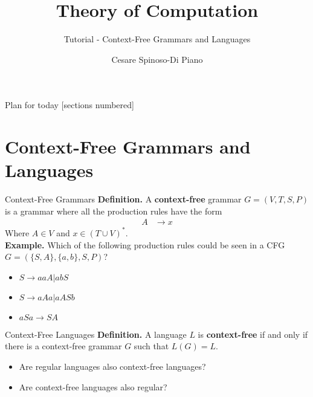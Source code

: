 \documentclass[10pt]{beamer}
\title{Theory of Computation}
\subtitle{Tutorial - Context-Free Grammars and Languages}
\author{Cesare Spinoso-Di Piano}
\date{}
\begin{document}
\maketitle

\begin{frame}{Plan for today}
    [sections numbered]
    \tableofcontents[hideallsubsections]
\end{frame}

\section{Context-Free Grammars and Languages}

\begin{frame}{Context-Free Grammars}
    \textbf{Definition.} A \textbf{context-free} grammar $G = (V,T,S,P)$ is a grammar where all the production rules have the form
    \begin{align*}
        A & \rightarrow x
    \end{align*}
    Where $A \in V$ and $x \in (T \cup V)^*$.\\
    \textbf{Example.} Which of the following production rules could be seen in a CFG $G = (\{S,A\},\{a,b\},S,P)$?
    \begin{itemize}
        \item $S \rightarrow aaA | abS$
        \item $S \rightarrow aAa | aASb$
        \item $aSa \rightarrow SA$
    \end{itemize}
\end{frame}

\begin{frame}{Context-Free Languages}
    \textbf{Definition.} A language $L$ is \textbf{context-free} if and only if there is a context-free grammar $G$ such that $L(G) = L$.
    \begin{itemize}
        \item Are regular languages also context-free languages?
        \item Are context-free languages also regular?
    \end{itemize}
\end{frame}
\end{document}
